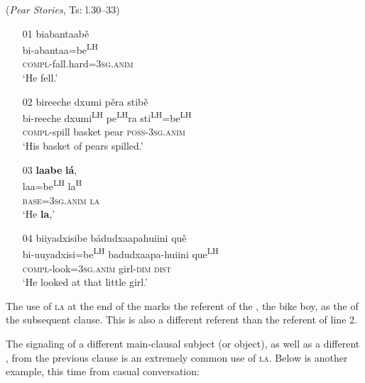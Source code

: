 \ea\label{markedIPR2}  (\textit{Pear Stories}, Ts: l.30--33)
\begin{itemize}
\item[01]
\glll biabantaab\v{e}  \\
bi-abantaa=be\textsuperscript{LH}  \\
\textsc{compl}-fall.hard=3\textsc{sg.anim}  \\
\glt `He fell.'


\item[02]
\glll bireeche dxumi p\v{e}ra stib\v{e}  \\
bi-reeche dxumi\textsuperscript{LH} pe\textsuperscript{LH}ra sti\textsuperscript{LH}=be\textsuperscript{LH}  \\
\textsc{compl}-spill basket pear \textsc{poss}-3\textsc{sg.anim}  \\
\glt `His basket of pears spilled.'


\item[03]
\glll \textbf{laabe} \textbf{l\'{a}},  \\
laa=be\textsuperscript{LH} la\textsuperscript{H}  \\
\textsc{base}=3\textsc{sg.anim} \textsc{la}  \\
\glt `He \textbf{la},'


\item[04]
\glll biiyadxisibe b\'{a}dudxaapahuiini qu\v{e}  \\
bi-uuyadxisi=be\textsuperscript{LH} badudxaapa-huiini que\textsuperscript{LH}  \\
\textsc{compl}-look=3\textsc{sg.anim} girl-\textsc{dim} \textsc{dist}  \\
\glt `He looked at that little girl.' 

\end{itemize}
\z
The use of \textsc{la} at the end of the  marks the referent of the , the bike boy, as the  of the subsequent clause. This is also a different  referent than the  referent of line 2.

The signaling of a different main-clausal subject (or object), as well as a different , from the previous clause is an extremely common use of \textsc{la}.  Below is another example, this time from casual conversation:


